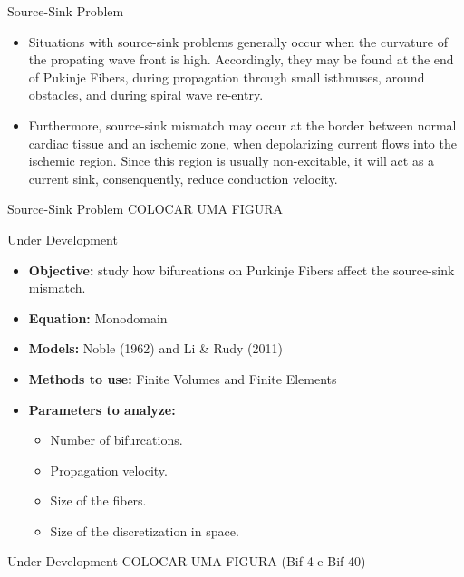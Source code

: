 \documentclass[unknownkeysallowed]{beamer}
\begin{document}
    \begin{frame}{Source-Sink Problem}
	   \begin{itemize}
	    \item Situations with source-sink problems generally occur when the curvature of the propating wave front is high. Accordingly, they may be found at the end of Pukinje Fibers, during propagation through small isthmuses, around obstacles, and during spiral wave re-entry. \newline
	    	    
 	    \item Furthermore, source-sink mismatch may occur at the border between normal cardiac tissue and an ischemic zone, when depolarizing current flows into the ischemic region. Since this region is usually non-excitable, it will act as a current sink, consenquently, reduce conduction velocity.
 	   \end{itemize}
    \end{frame}
    
    \begin{frame}{Source-Sink Problem}
	    COLOCAR UMA FIGURA
    \end{frame}
    
    \begin{frame}{Under Development}
	    \begin{itemize}
		    \item \textbf{Objective:} study how bifurcations on Purkinje Fibers affect the source-sink mismatch. \newline
		    \item \textbf{Equation:} Monodomain \newline
		    \item \textbf{Models:} Noble (1962) and Li \& Rudy (2011) \newline
		    \item \textbf{Methods to use:} Finite Volumes and Finite Elements \newline
		    \item \textbf{Parameters to analyze:}
		    \begin{itemize}
			    \item Number of bifurcations. 
			    \item Propagation velocity. 
			    \item Size of the fibers. 
			    \item Size of the discretization in space.
			\end{itemize}
	    \end{itemize}
    \end{frame}
    
    \begin{frame}{Under Development}
	    COLOCAR UMA FIGURA (Bif 4 e Bif 40)
    \end{frame}
\end{document}
